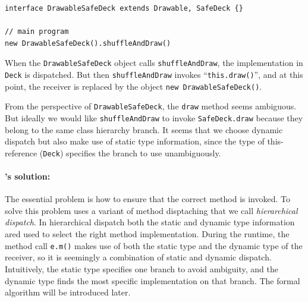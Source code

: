 \vspace{3pt}\begin{lstlisting}
interface DrawableSafeDeck extends Drawable, SafeDeck {}

// main program
new DrawableSafeDeck().shuffleAndDraw()
\end{lstlisting}\vspace{3pt}
When the \lstinline|DrawableSafeDeck| object calls \lstinline|shuffleAndDraw|, the implementation in \lstinline|Deck|
is dispatched. But then \lstinline|shuffleAndDraw| invokes ``\lstinline|this.draw()|'', and at this point, the receiver
is replaced by the object \lstinline|new DrawableSafeDeck()|.

From the perspective of \lstinline|DrawableSafeDeck|, the \lstinline|draw| method seems ambiguous. But ideally we would
like \lstinline|shuffleAndDraw| to invoke \lstinline|SafeDeck.draw|
because they belong to the same class hierarchy branch. It
seems that we choose dynamic dispatch but also make use of static type
information, since the type of this-reference (\lstinline|Deck|)
specifies the branch to use unambiguously.


\paragraph{\MIM's solution:} 
The essential problem is how to ensure that the correct method is
invoked. To solve this problem \MIM{} uses a variant of method
disptaching that we call \textit{hierarchical dispatch}. In
hierarchical dispatch both the static and dynamic type information 
ared used to select the right method implementation.
During the runtime, the method call \lstinline|e.m()|
makes use of both the static type and the dynamic type of the receiver, so it is seemingly a
combination of static and dynamic dispatch. Intuitively, the static type specifies one branch
to avoid ambiguity, and the dynamic type finds the most specific implementation on that branch. The formal algorithm
will be introduced later.


